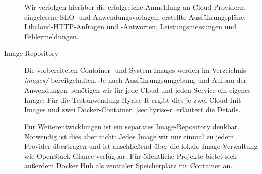 \begin{description}
	Wir verfolgen hierüber die erfolgreiche Anmeldung an Cloud-Providern, eingelesene SLO- und Anwendungsvorlagen, erstellte Ausführungspläne, Libcloud-HTTP-Anfragen und -Antworten, Leistungsmessungen und Fehlermeldungen.	
	
	\item[Image-Repository] Die vorbereiteten Container- und System-Images werden im Verzeichnis \emph{images/} bereitgehalten. Je nach Ausführungsumgebung und Aufbau der Anwendungen benötigen wir für jede Cloud und jeden Service ein eigenes Image: Für die Testanwendung Hyrise-R ergibt dies je zwei Cloud-Init-Images und zwei Docker-Container. \autoref{sec:hyrise-r} erläutert die Details.
	
	Für Weiterentwicklungen ist ein separates Image-Repository denkbar. Notwendig ist dies aber nicht: Jedes Image wir nur einmal zu jedem Provider übertragen und ist anschließend über die lokale Image-Verwaltung wie OpenStack Glance verfügbar. Für öffentliche Projekte bietet sich außerdem Docker Hub als zentraler Speicherplatz für Container an.
	
\end{description}